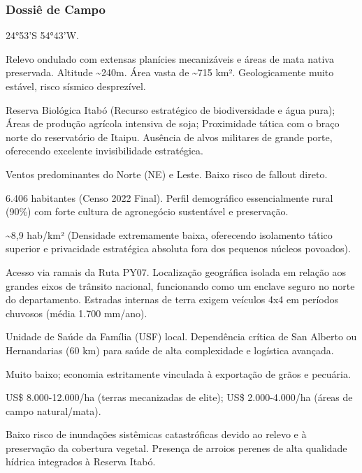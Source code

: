 \subsubsection{Dossiê de Campo}
\begin{description}[style=nextline,leftmargin=0.5cm,font=\bfseries]
\item[Coordenadas]  24°53'S 54°43'W.
\item[Topografia]  Relevo ondulado com extensas planícies mecanizáveis e áreas de mata nativa preservada. Altitude \textasciitilde 240m. Área vasta de \textasciitilde 715 km². Geologicamente muito estável, risco sísmico desprezível.
\item[Alvos Estratégicos]  Reserva Biológica Itabó (Recurso estratégico de biodiversidade e água pura); Áreas de produção agrícola intensiva de soja; Proximidade tática com o braço norte do reservatório de Itaipu. Ausência de alvos militares de grande porte, oferecendo excelente invisibilidade estratégica.
\item[Fallout]  Ventos predominantes do Norte (NE) e Leste. Baixo risco de fallout direto.
\item[População]  6.406 habitantes (Censo 2022 Final). Perfil demográfico essencialmente rural (90\%) com forte cultura de agronegócio sustentável e preservação.
\item[Densidade]  \textasciitilde 8,9 hab/\allowbreak km² (Densidade extremamente baixa, oferecendo isolamento tático superior e privacidade estratégica absoluta fora dos pequenos núcleos povoados).
\item[Vias de Acesso]  Acesso via ramais da Ruta PY07. Localização geográfica isolada em relação aos grandes eixos de trânsito nacional, funcionando como um enclave seguro no norte do departamento. Estradas internas de terra exigem veículos 4x4 em períodos chuvosos (média 1.700 mm/\allowbreak ano).
\item[Serviços]  Unidade de Saúde da Família (USF) local. Dependência crítica de San Alberto ou Hernandarias (60 km) para saúde de alta complexidade e logística avançada.
\item[Custo de Vida]  Muito baixo; economia estritamente vinculada à exportação de grãos e pecuária.
\item[Preço da Terra]  US\$ 8.000-12.000/\allowbreak ha (terras mecanizadas de elite); US\$ 2.000-4.000/\allowbreak ha (áreas de campo natural/\allowbreak mata).
\item[Hidrologia]  Baixo risco de inundações sistêmicas catastróficas devido ao relevo e à preservação da cobertura vegetal. Presença de arroios perenes de alta qualidade hídrica integrados à Reserva Itabó.

\end{description}
